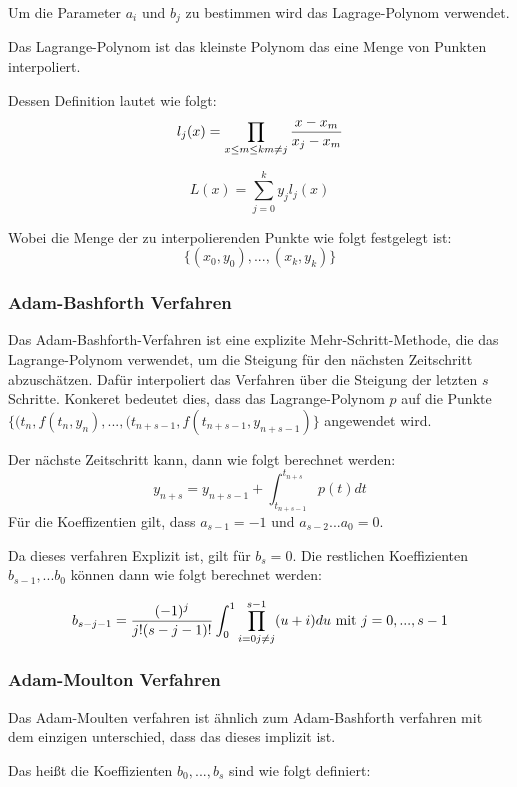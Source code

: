 Um die Parameter $a_i$ und $b_j$ zu bestimmen wird das Lagrage-Polynom verwendet.

Das Lagrange-Polynom ist das kleinste Polynom das eine Menge von Punkten interpoliert.

Dessen Definition lautet wie folgt:
$$
l_j(x) = \prod_{x \leq m \leq k \\ m \neq j} \frac{x - x_m}{x_j - x_m}
$$

$$
L(x) = \sum_{j = 0}^{k} y_j l_j(x)
$$

Wobei die Menge der zu interpolierenden Punkte wie folgt festgelegt ist:
$$
\{(x_0, y_0), ..., (x_k, y_k)\}
$$

\subsubsection{Adam-Bashforth Verfahren} \label{sec:adam-bashforth}

Das Adam-Bashforth-Verfahren ist eine explizite Mehr-Schritt-Methode, 
die das Lagrange-Polynom verwendet, 
um die Steigung für den nächsten Zeitschritt abzuschätzen. 
Dafür interpoliert das Verfahren über die Steigung der letzten $s$ Schritte.
Konkeret bedeutet dies, dass das Lagrange-Polynom $p$ auf die Punkte $\{(t_{n}, f(t_{n}, y_{n}), ..., (t_{n + s - 1}, f(t_{n + s - 1}, y_{n + s - 1})\}$ angewendet wird.

Der nächste Zeitschritt kann, dann wie folgt berechnet werden:
$$
y_{n + s} = y_{n + s -1} + \int_{t_{n+s-1}}^{t_{n + s}} p(t) dt
$$
Für die Koeffizentien gilt, dass $a_{s-1} = -1$ und $a_{s-2} ... a_{0} = 0$. 

Da dieses verfahren Explizit ist, gilt für $b_s = 0$. Die restlichen Koeffizienten $b_{s-1}, ... b_{0}$
können dann wie folgt berechnet werden:

$$
b_{s - j - 1} = \frac{(-1)^j}{j!(s- j -1 )!} \int_0^1 \prod_{i = 0 \\ j \neq j}^{s-1} (u + i) du \text{ mit } j = 0, ...,  s-1 
$$


\subsubsection{Adam-Moulton Verfahren} \label{adam-moulton}

Das Adam-Moulten verfahren ist ähnlich zum
Adam-Bashforth verfahren mit dem einzigen unterschied, dass das dieses implizit ist.

Das heißt die Koeffizienten $b_{0}, ..., b_{s}$ sind wie folgt definiert:

